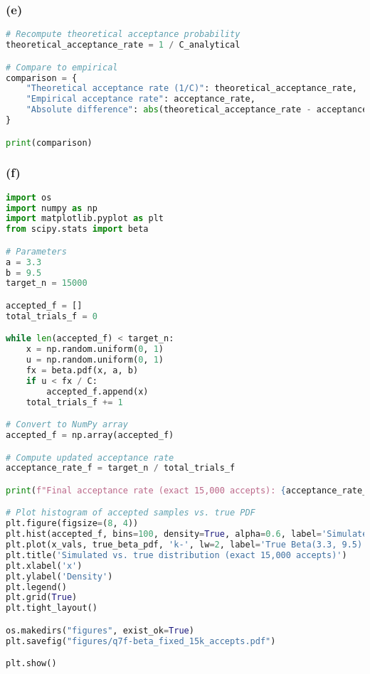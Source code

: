 \subsubsection*{(e)}

\begin{lstlisting}[language=Python]
# Recompute theoretical acceptance probability
theoretical_acceptance_rate = 1 / C_analytical

# Compare to empirical
comparison = {
    "Theoretical acceptance rate (1/C)": theoretical_acceptance_rate,
    "Empirical acceptance rate": acceptance_rate,
    "Absolute difference": abs(theoretical_acceptance_rate - acceptance_rate)
}

print(comparison)
\end{lstlisting}


\subsubsection*{(f)}

\begin{lstlisting}[language=Python]
import os
import numpy as np
import matplotlib.pyplot as plt
from scipy.stats import beta

# Parameters
a = 3.3
b = 9.5
target_n = 15000

accepted_f = []
total_trials_f = 0

while len(accepted_f) < target_n:
    x = np.random.uniform(0, 1)
    u = np.random.uniform(0, 1)
    fx = beta.pdf(x, a, b)
    if u < fx / C:
        accepted_f.append(x)
    total_trials_f += 1

# Convert to NumPy array
accepted_f = np.array(accepted_f)

# Compute updated acceptance rate
acceptance_rate_f = target_n / total_trials_f

print(f"Final acceptance rate (exact 15,000 accepts): {acceptance_rate_f}")

# Plot histogram of accepted samples vs. true PDF
plt.figure(figsize=(8, 4))
plt.hist(accepted_f, bins=100, density=True, alpha=0.6, label='Simulated samples', color='green')
plt.plot(x_vals, true_beta_pdf, 'k-', lw=2, label='True Beta(3.3, 9.5) PDF')
plt.title('Simulated vs. true distribution (exact 15,000 accepts)')
plt.xlabel('x')
plt.ylabel('Density')
plt.legend()
plt.grid(True)
plt.tight_layout()

os.makedirs("figures", exist_ok=True)
plt.savefig("figures/q7f-beta_fixed_15k_accepts.pdf")

plt.show()
\end{lstlisting}

